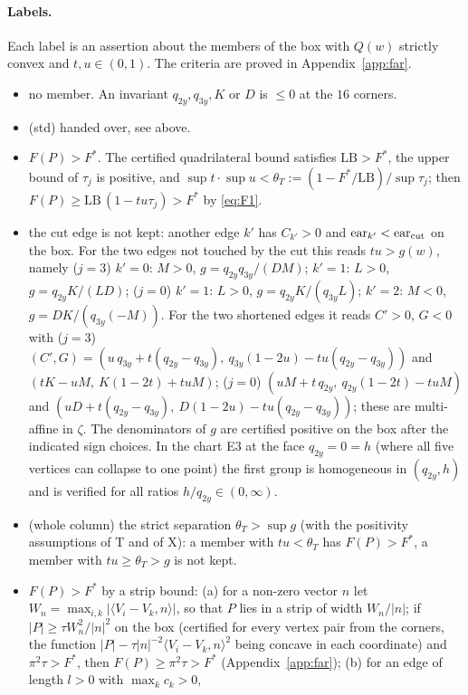 \documentclass[11pt]{article}
\theoremstyle{remark}
\begin{document}
\paragraph{Labels.} Each label is an assertion about the members of the box with $Q(w)$ strictly convex and
$t,u\in(0,1)$.
The criteria are proved in Appendix~\ref{app:far}.
\begin{itemize}\setlength\itemsep{1pt}
\item[V:] no member. An invariant $q_{2y},q_{3y},K$ or $D$ is $\le0$ at the $16$ corners.
\item[E2, E3:] (std) handed over, see above.
\item[T:] $F(P)>F^*$. The certified quadrilateral bound satisfies $\mathrm{LB}>F^*$, the upper bound of $\tau_j$ is positive, and
$\sup t\cdot\sup u<\theta_T:=(1-F^*/\mathrm{LB})/\sup\tau_j$; then
$F(P)\ge\mathrm{LB}\,(1-tu\tau_j)>F^*$ by \eqref{eq:F1}.
\item[X:] the cut edge is not kept: another edge $k'$ has $C_{k'}>0$ and $\mathrm{ear}_{k'}<\mathrm{ear}_{\rm cut}$ on the
box. For the two edges not touched by the cut this reads $tu>g(w)$, namely
($j=3$) $k'=0$: $M>0$, $g=q_{2y}q_{3y}/(DM)$; $k'=1$: $L>0$, $g=q_{2y}K/(LD)$;
($j=0$) $k'=1$: $L>0$, $g=q_{2y}K/(q_{3y}L)$; $k'=2$: $M<0$, $g=DK/(q_{3y}(-M))$.
For the two shortened edges it reads $C'>0$, $G<0$ with
($j=3$) $(C',G)=(u\,q_{3y}+t(q_{2y}-q_{3y}),\ q_{3y}(1-2u)-tu(q_{2y}-q_{3y}))$ and $(tK-uM,\ K(1-2t)+tuM)$;
($j=0$) $(uM+t\,q_{2y},\ q_{2y}(1-2t)-tuM)$ and $(uD+t(q_{2y}-q_{3y}),\ D(1-2u)-tu(q_{2y}-q_{3y}))$;
these are multi-affine in $\zeta$. The denominators of $g$ are certified positive on the box after the indicated sign
choices. In the chart E3 at the face $q_{2y}=0=h$ (where all five vertices can collapse to
one point) the first group is homogeneous in $(q_{2y},h)$ and is verified for all ratios $h/q_{2y}\in(0,\infty)$.
\item[TX:] (whole column) the strict separation $\theta_T>\sup g$ (with the positivity assumptions of T and of X): a member with
$tu<\theta_T$ has $F(P)>F^*$, a member with $tu\ge\theta_T>g$ is not kept.
\item[S:] $F(P)>F^*$ by a strip bound: (a) for a non-zero vector $n$ let $W_n=\max_{i,k}|\langle V_i-V_k,n\rangle|$, so
that $P$ lies in a strip of width $W_n/|n|$; if $|P|\ge\tau W_n^2/|n|^2$ on the box (certified for every vertex pair from
the corners, the function $|P|-\tau|n|^{-2}\langle V_i-V_k,n\rangle^2$ being concave in each coordinate) and
$\pi^2\tau>F^*$, then $F(P)\ge\pi^2\tau>F^*$ (Appendix~\ref{app:far}); (b) for an edge of length $l>0$ with $\max_kc_k>0$,

\end{itemize}
\end{document}
